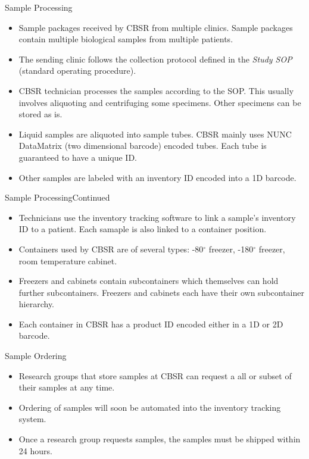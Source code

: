 \documentclass{beamer}
\begin{document}
\begin{frame}{Sample Processing}{}
  \begin{itemize}
    \item Sample packages received by CBSR from multiple clinics. Sample
      packages contain multiple biological samples from multiple patients.
    \item The sending clinic follows the collection protocol defined in the
      \emph{Study SOP} (standard operating procedure).
    \item CBSR technician processes the samples according to the SOP. This
      usually involves aliquoting and centrifuging some specimens. Other
      specimens can be stored as is.
    \item Liquid samples are aliquoted into sample tubes. CBSR mainly uses NUNC
      DataMatrix (two dimensional barcode) encoded tubes. Each tube is
      guaranteed to have a unique ID.
    \item Other samples are labeled with an inventory ID encoded into a 1D
      barcode.
  \end{itemize}
\end{frame}

\begin{frame}{Sample Processing}{Continued}
  \begin{itemize}
    \item Technicians use the inventory tracking software to link a sample's
      inventory ID to a patient. Each samaple is also linked to a container
      position.
    \item Containers used by CBSR are of several types: -80$^\circ$ freezer,
      -180$^\circ$ freezer, room temperature cabinet.
    \item Freezers and cabinets contain subcontainers which themselves can hold
      further subcontainers. Freezers and cabinets each have their own
      subcontainer hierarchy.
    \item Each container in CBSR has a product ID encoded either in a 1D or 2D
      barcode.
  \end{itemize}
\end{frame}

\begin{frame}{Sample Ordering}
  \begin{itemize}
    \item Research groups that store samples at CBSR can request a all or
      subset of their samples at any time.
    \item Ordering of samples will soon be automated into the inventory
      tracking system.
    \item Once a research group requests samples, the samples must be shipped
      within 24 hours.
  \end{itemize}
\end{frame}
\end{document}

